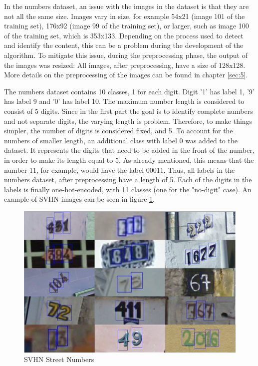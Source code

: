 \documentclass[final,12p,times]{elsarticle}
\begin{document}
\begin{Itemize}
In the numbers dataset, an issue with the images in the dataset is that they are not all the same size.
Images vary in size, for example 54x21 (image 101 of the training set), 176x92 (image 99 of the training set), or larger, such 
as image 100 of the training set, which is 353x133.
Depending on the process used to detect and identify the content, this can be a problem during the development of the algorithm.
To mitigate this issue, during the preprocessing phase, the output of the images was resized: 
All images, after preprocessing, have a size of 128x128.
More details on the preprocessing of the images can be found in chapter \ref{sec:5}.

The numbers dataset contains 10 classes, 1 for each digit. 
Digit '1' has label 1, '9' has label 9 and '0' has label 10.
The maximum number length is considered to consist of 5 digits. 
Since in the first part the goal is to identify complete numbers and not separate digits, the varying length is problem.
Therefore, to make things simpler, the number of digits is considered fixed, and 5. 
To account for the numbers of smaller length, an additional class with label 0 was added to the dataset. 
It represents the digits that need to be added in the front of the number, in order to make its length equal to 5.
As already mentioned, this means that the number 11, for example, would have the label 00011.
Thus, all labels in the numbers dataset, after preprocessing have a length of 5.
Each of the digits in the labels is finally  one-hot-encoded, with 11 classes (one for the "no-digit" case).
An example of SVHN images can be seen in figure \ref{fig:Fig4.1}.

\begin{figure}[H]
  \includegraphics[width=1.0\textwidth, center]{svhn_numbers.png}
  \caption{SVHN Street Numbers}
  \label{fig:Fig4.1}
  \end{figure}
  

\end{Itemize}
\end{document}

